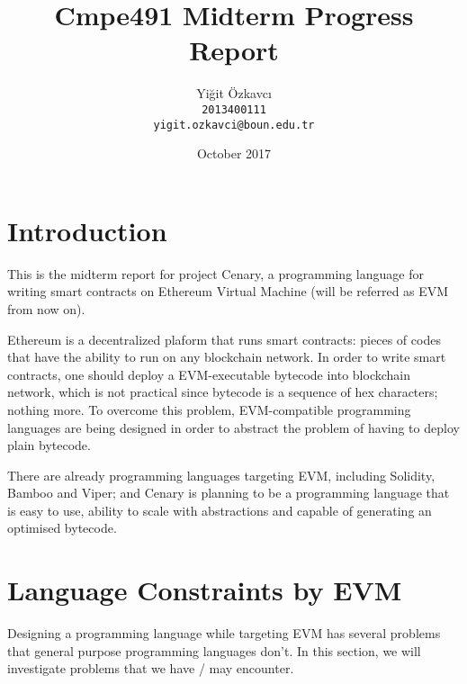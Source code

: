 \documentclass{article}
\title{Cmpe491 Midterm Progress Report}
\author{
  Yiğit Özkavcı \\
  \texttt{2013400111} \\
  \texttt{yigit.ozkavci@boun.edu.tr}
}
\date{October 2017}
\begin{document}

\maketitle

\tableofcontents

\newpage

\section{Introduction}
\par 
\par This is the midterm report for project Cenary, a programming language for writing smart contracts on Ethereum Virtual Machine (will be referred as EVM from now on).
\par Ethereum is a decentralized plaform that runs smart contracts: pieces of codes that have the ability to run on any blockchain network. In order to write smart contracts, one should deploy a EVM-executable bytecode into blockchain network, which is not practical since bytecode is a sequence of hex characters; nothing more. To overcome this problem, EVM-compatible programming languages are being designed in order to abstract the problem of having to deploy plain bytecode. 
\par There are already programming languages targeting EVM, including Solidity\cite{solidity}, Bamboo\cite{bamboo} and Viper\cite{viper}; and Cenary is planning to be a programming language that is easy to use, ability to scale with abstractions and capable of generating an optimised bytecode.

\section{Language Constraints by EVM}
Designing a programming language while targeting EVM has several problems that general purpose programming languages don't. In this section, we will investigate problems that we have / may encounter.
\end{document}
